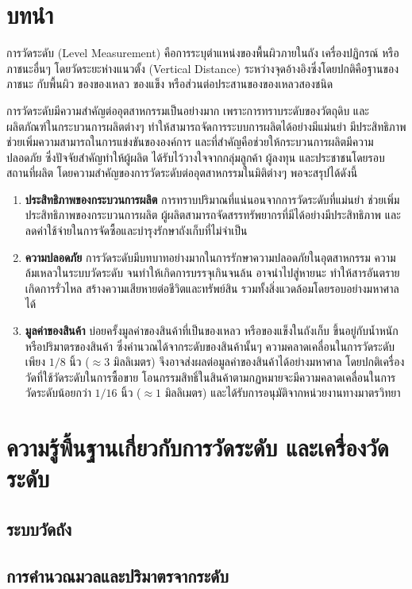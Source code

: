 \documentclass[final,11pt]{article}
\begin{document}
\section{บทนำ}
การวัดระดับ (Level Measurement) คือการระบุตำแหน่งของพื้นผิวภายในถัง เครื่องปฏิกรณ์
หรือภาชนะอื่นๆ โดยวัดระยะห่างแนวตั้ง (Vertical Distance) ระหว่างจุดอ้างอิงซึ่งโดยปกติคือฐานของภาชนะ กับพื้นผิว
ของของเหลว ของแข็ง หรือส่วนต่อประสานของของเหลวสองชนิด

การวัดระดับมีความสำคัญต่ออุตสาหกรรมเป็นอย่างมาก เพราะการทราบระดับของวัตถุดิบ และผลิตภัณฑ์ในกระบวนการผลิตต่างๆ
ทำให้สามารถจัดการระบบการผลิตได้อย่างมีแม่นยำ มีประสิทธิภาพ ช่วยเพิ่มความสามารถในการแข่งขันขององค์การ 
และที่สำคัญคือช่วยให้กระบวนการผลิตมีความปลอดภัย ซึ่งปัจจัยสำคัญทำให้ผู้ผลิต ได้รับไว้วางใจจากกลุ่มลูกค้า ผู้ลงทุน และประชาชนโดยรอบสถานที่ผลิต
โดยความสำคัญของการวัดระดับต่ออุตสาหกรรมในมิติต่างๆ พอจะสรุปได้ดังนี้ 
\begin{enumerate}
    \item \textbf{ประสิทธิภาพของกระบวนการผลิต} การทราบปริมาณที่แน่นอนจากการวัดระดับที่แม่นยำ
    ช่วยเพิ่มประสิทธิภาพของกระบวนการผลิต ผู้ผลิตสามารถจัดสรรทรัพยากรที่มีได้อย่างมีประสิทธิภาพ 
    และลดค่าใช้จ่ายในการจัดซื้อและบำรุงรักษาถังเก็บที่ไม่จำเป็น
    \item \textbf{ความปลอดภัย} การวัดระดับมีบทบาทอย่างมากในการรักษาความปลอดภัยในอุตสาหกรรม
    ความล้มเหลวในระบบวัดระดับ จนทำให้เกิดการบรรจุเกินจนล้น อาจนำไปสู่หายนะ ทำให้สารอันตรายเกิดการรั่วไหล
    สร้างความเสียหายต่อชีวิตและทรัพย์สิน รวมทั้งสิ่งแวดล้อมโดยรอบอย่างมหาศาลได้ 
    \item \textbf{มูลค่าของสินค้า} บ่อยครั้งมูลค่าของสินค้าที่เป็นของเหลว หรือของแข็งในถังเก็บ
    ขึ้นอยู่กับน้ำหนัก หรือปริมาตรของสินค้า ซึ่งคำนวณได้จากระดับของสินค้านั้นๆ 
    ความคลาดเคลื่อนในการวัดระดับเพียง $1/8$ นิ้ว ($\approx 3$ มิลลิเมตร) 
    จึงอาจส่งผลต่อมูลค่าของสินค้าได้อย่างมหาศาล โดยปกติเครื่องวัดที่ใช้วัดระดับในการซื้อขาย
    โอนกรรมสิทธิ์ในสินค้าตามกฏหมายจะมีความคลาดเคลื่อนในการวัดระดับน้อยกว่า  $1/16$ นิ้ว ($\approx 1$ มิลลิเมตร)
    และได้รับการอนุมัติจากหน่วยงานทางมาตรวิทยา
\end{enumerate}
\section{ความรู้พื้นฐานเกี่ยวกับการวัดระดับ และเครื่องวัดระดับ}
\subsection{ระบบวัดถัง}
\subsection{การคำนวณมวลและปริมาตรจากระดับ}
\end{document}
